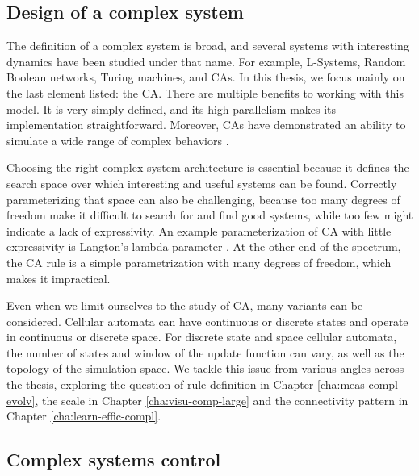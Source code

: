 \subsection{Design of a complex system\label{sec:design-compl-syst}}

The definition of a complex system is broad, and several systems with
interesting dynamics have been studied under that name. For example, L-Systems,
Random Boolean networks, Turing machines, and \Acfp{CA}. In this thesis, we
focus mainly on the last element listed: the \acl{CA}. There are multiple
benefits to working with this model. It is very simply defined, and its high
parallelism makes its implementation straightforward. Moreover, \acp{CA} have
demonstrated an ability to simulate a wide range of complex behaviors
\parencite{wolframNewKindScience2002}.

Choosing the right complex system architecture is essential because it defines
the search space over which interesting and useful systems can be found.
Correctly parameterizing that space can also be challenging, because too many
degrees of freedom make it difficult to search for and find good systems, while
too few might indicate a lack of expressivity. An example parameterization of
\ac{CA} with little expressivity is Langton's lambda parameter
\parencite{langtonComputationEdgeChaos1990}. At the other end of the spectrum, the
\ac{CA} rule is a simple parametrization with many degrees of freedom, which
makes it impractical.

Even when we limit ourselves to the study of \ac{CA}, many variants can be
considered. Cellular automata can have continuous or discrete states and operate
in continuous or discrete space. For discrete state and space cellular automata,
the number of states and window of the update function can vary, as well as the
topology of the simulation space. We tackle this issue from various angles
across the thesis, exploring the question of rule definition in Chapter
\ref{cha:meas-compl-evolv}, the scale in Chapter \ref{cha:visu-comp-large} and
the connectivity pattern in Chapter \ref{cha:learn-effic-compl}.

\subsection{Complex systems control}\label{sec:compl-syst-contr}

